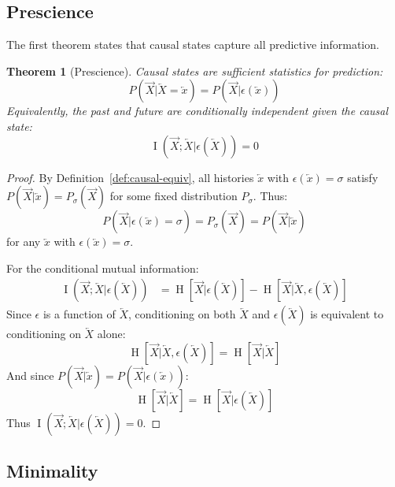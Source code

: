 \documentclass[11pt,twocolumn]{article}
\theoremstyle{plain}
\newtheorem{theorem}{Theorem}[section]
\theoremstyle{definition}
\theoremstyle{remark}
\newcommand{\Past}{\overleftarrow{X}}
\newcommand{\Future}{\overrightarrow{X}}
\newcommand{\past}{\overleftarrow{x}}
\DeclareMathOperator{\Ent}{H}
\DeclareMathOperator{\MI}{I}
\begin{document}
\subsection{Prescience}

The first theorem states that causal states capture all predictive information.

\begin{theorem}[Prescience]
\label{thm:prescience}
Causal states are sufficient statistics for prediction:
\begin{equation}
    P(\Future | \Past = \past) = P(\Future | \epsilon(\past))
\end{equation}
Equivalently, the past and future are conditionally independent given the causal state:
\begin{equation}
    \MI(\Future; \Past | \epsilon(\Past)) = 0
\end{equation}
\end{theorem}
\begin{proof}
By Definition~\ref{def:causal-equiv}, all histories $\past$ with $\epsilon(\past) = \sigma$ satisfy $P(\Future | \past) = P_\sigma(\Future)$ for some fixed distribution $P_\sigma$. Thus:
\begin{equation}
    P(\Future | \epsilon(\past) = \sigma) = P_\sigma(\Future) = P(\Future | \past)
\end{equation}
for any $\past$ with $\epsilon(\past) = \sigma$.

For the conditional mutual information:
\begin{align}
    \MI(\Future; \Past | \epsilon(\Past)) &= \Ent[\Future | \epsilon(\Past)] - \Ent[\Future | \Past, \epsilon(\Past)]
\end{align}
Since $\epsilon$ is a function of $\Past$, conditioning on both $\Past$ and $\epsilon(\Past)$ is equivalent to conditioning on $\Past$ alone:
\begin{equation}
    \Ent[\Future | \Past, \epsilon(\Past)] = \Ent[\Future | \Past]
\end{equation}
And since $P(\Future | \past) = P(\Future | \epsilon(\past))$:
\begin{equation}
    \Ent[\Future | \Past] = \Ent[\Future | \epsilon(\Past)]
\end{equation}
Thus $\MI(\Future; \Past | \epsilon(\Past)) = 0$.
\end{proof}

\subsection{Minimality}
\end{document}
